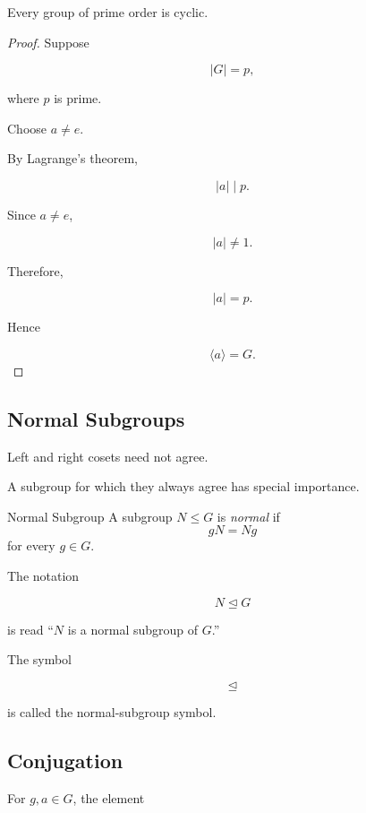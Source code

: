 \begin{theorem}
Every group of prime order is cyclic.
\end{theorem}

\begin{proof}
Suppose

\[ |G|=p, \]

where \(p\) is prime.

Choose \(a\neq e\).

By Lagrange's theorem,

\[ |a|\mid p. \]

Since \(a\neq e\),

\[ |a|\neq1. \]

Therefore,

\[ |a|=p. \]

Hence

\[ \langle a\rangle=G. \]
\end{proof}

\subsection{Normal Subgroups}
\label{subsec:normal-subgroups}

Left and right cosets need not agree.

A subgroup for which they always agree has special importance.

\begin{definitionbox}{Normal Subgroup}
A subgroup \(N\leq G\) is \emph{normal} if
\[ gN=Ng \]
for every \(g\in G\).
\end{definitionbox}

The notation

\[ N\trianglelefteq G \]

is read ``\(N\) is a normal subgroup of \(G\).''

The symbol

\[ \trianglelefteq \]

is called the normal-subgroup symbol.

\subsection{Conjugation}
\label{subsec:group-conjugation}

For \(g,a\in G\), the element

